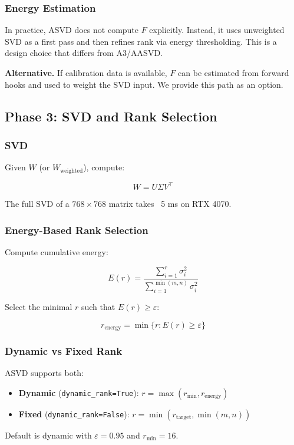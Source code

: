 \subsubsection{Energy Estimation}

In practice, ASVD does not compute $F$ explicitly. Instead, it uses 
unweighted SVD as a first pass and then refines rank via energy 
thresholding. This is a design choice that differs from A3/AASVD.

\textbf{Alternative.} If calibration data is available, $F$ can be estimated 
from forward hooks and used to weight the SVD input. We provide this path 
as an option.

\subsection{Phase 3: SVD and Rank Selection}

\subsubsection{SVD}

Given $W$ (or $W_\text{weighted}$), compute:

\[
W = U \Sigma V^\top
\]

The full SVD of a $768 \times 768$ matrix takes ~5 ms on RTX 4070.

\subsubsection{Energy-Based Rank Selection}

Compute cumulative energy:

\[
E(r) = \frac{\sum_{i=1}^r \sigma_i^2}{\sum_{i=1}^{\min(m, n)} \sigma_i^2}
\]

Select the minimal $r$ such that $E(r) \geq \varepsilon$:

\[
r_\text{energy} = \min\{r : E(r) \geq \varepsilon\}
\]

\subsubsection{Dynamic vs Fixed Rank}

ASVD supports both:

\begin{itemize}
\item \textbf{Dynamic} (\texttt{dynamic\_rank=True}): $r = \max(r_\text{min}, r_\text{energy})$
\item \textbf{Fixed} (\texttt{dynamic\_rank=False}): $r = \min(r_\text{target}, \min(m, n))$

\end{itemize}
Default is dynamic with $\varepsilon = 0.95$ and 
$r_\text{min} = 16$.

